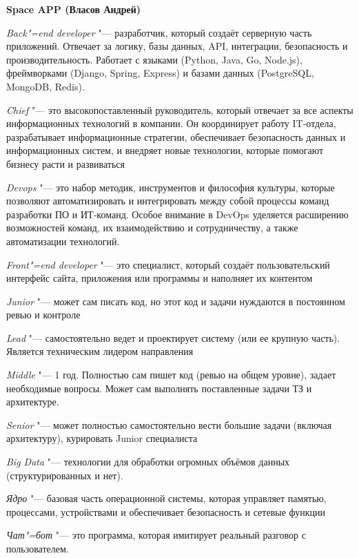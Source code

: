 \documentclass{article}
\begin{document}
\begin{center}
    \textbf{Space APP (Власов Андрей)}
\end{center}

\textit{Back"=end developer} "--- разработчик, который создаёт серверную часть приложений. Отвечает за логику, базы данных, API, интеграции, безопасность и производительность. Работает с языками (Python, Java, Go, Node.js), фреймворками (Django, Spring, Express) и базами данных (PostgreSQL, MongoDB, Redis).

\textit{Chief} "--- это высокопоставленный руководитель, который отвечает за все аспекты информационных технологий в компании. Он координирует работу IT-отдела, разрабатывает информационные стратегии, обеспечивает безопасность данных и информационных систем, и внедряет новые технологии, которые помогают бизнесу расти и развиваться

\textit{Devops} "--- это набор методик, инструментов и философия культуры, которые позволяют автоматизировать и интегрировать между собой процессы команд разработки ПО и ИТ‑команд. Особое внимание в DevOps уделяется расширению возможностей команд, их взаимодействию и сотрудничеству, а также автоматизации технологий.

\textit{Front"=end developer} "--- это специалист, который создаёт пользовательский интерфейс сайта, приложения или программы и наполняет их контентом

\textit{Junior} "--- может сам писать код, но этот код и задачи нуждаются в постоянном ревью и контроле

\textit{Lead} "--- самостоятельно ведет и проектирует систему (или ее крупную часть). Является техническим лидером направления

\textit{Middle} "--- 1 год. Полностью сам пишет код (ревью на общем уровне), задает необходимые вопросы. Может сам выполнять поставленные задачи ТЗ и архитектуре.

\textit{Senior} "--- может полностью самостоятельно вести большие задачи (включая архитектуру), курировать Junior специалиста

\textit{Big Data} "--- технологии для обработки огромных объёмов данных (структурированных и нет).

\textit{Ядро} "--- базовая часть операционной системы, которая управляет памятью, процессами, устройствами и обеспечивает безопасность и сетевые функции

\textit{Чат"=бот} "--- это программа, которая имитирует реальный разговор с
пользователем. 
\end{document}
